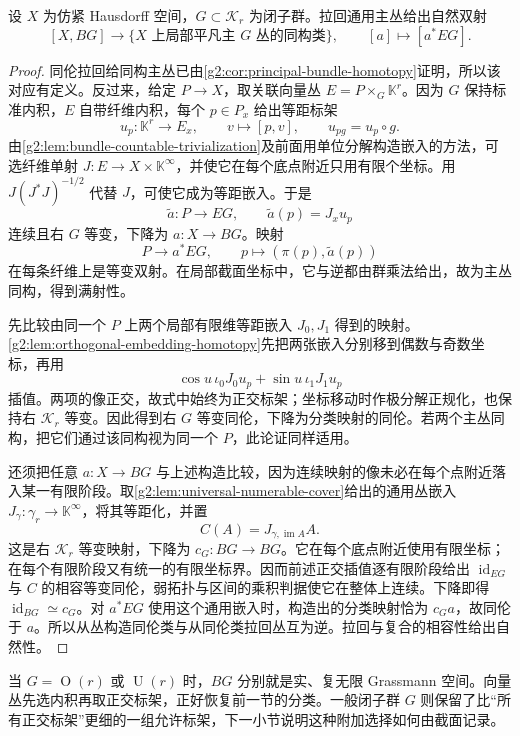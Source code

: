 \begin{theorem}\label{g2:thm:compact-matrix-principal-classification}
	设 \(X\) 为仿紧 Hausdorff 空间，\(G\subset \mathcal K_r\) 为闭子群。拉回通用主丛给出自然双射
	\[
		[X,BG]\longrightarrow
		\{X\text{ 上局部平凡主 }G\text{ 丛的同构类}\},
		\qquad [a]\longmapsto[a^*EG].
	\]
\end{theorem}
\begin{proof}
	同伦拉回给同构主丛已由\cref{g2:cor:principal-bundle-homotopy}证明，所以该对应有定义。反过来，给定 \(P\to X\)，取关联向量丛 \(E=P\times_G \mathbb K^r\)。因为 \(G\) 保持标准内积，\(E\) 自带纤维内积，每个 \(p\in P_x\) 给出等距标架
	\[
		u_p:\mathbb K^r\longrightarrow E_x,\qquad v\longmapsto[p,v],
		\qquad u_{pg}=u_p\circ g.
	\]
	由\cref{g2:lem:bundle-countable-trivialization}及前面用单位分解构造嵌入的方法，可选纤维单射 \(J:E\to X\times \mathbb K^\infty\)，并使它在每个底点附近只用有限个坐标。用 \(J(J^*J)^{-1/2}\) 代替 \(J\)，可使它成为等距嵌入。于是
	\[
		\widetilde a:P\longrightarrow EG,\qquad
		\widetilde a(p)=J_xu_p
	\]
	连续且右 \(G\) 等变，下降为 \(a:X\to BG\)。映射
	\[
		P\longrightarrow a^*EG,\qquad p\longmapsto(\pi(p),\widetilde a(p))
	\]
	在每条纤维上是等变双射。在局部截面坐标中，它与逆都由群乘法给出，故为主丛同构，得到满射性。

	先比较由同一个 \(P\) 上两个局部有限维等距嵌入 \(J_0,J_1\) 得到的映射。\cref{g2:lem:orthogonal-embedding-homotopy}先把两张嵌入分别移到偶数与奇数坐标，再用
	\[
		\cos u\,\iota_0J_0u_p+\sin u\,\iota_1J_1u_p
	\]
	插值。两项的像正交，故式中始终为正交标架；坐标移动时作极分解正规化，也保持右 \(\mathcal K_r\) 等变。因此得到右 \(G\) 等变同伦，下降为分类映射的同伦。若两个主丛同构，把它们通过该同构视为同一个 \(P\)，此论证同样适用。

	还须把任意 \(a:X\to BG\) 与上述构造比较，因为连续映射的像未必在每个点附近落入某一有限阶段。取\cref{g2:lem:universal-numerable-cover}给出的通用丛嵌入 \(J_\gamma:\gamma_r\to \mathbb K^\infty\)，将其等距化，并置
	\[
		C(A)=J_{\gamma,\operatorname{im}A}A.
	\]
	这是右 \(\mathcal K_r\) 等变映射，下降为 \(c_G:BG\to BG\)。它在每个底点附近使用有限坐标；在每个有限阶段又有统一的有限坐标界。因而前述正交插值逐有限阶段给出 \(\operatorname{id}_{EG}\) 与 \(C\) 的相容等变同伦，弱拓扑与区间的乘积判据使它在整体上连续。下降即得 \(\operatorname{id}_{BG}\simeq c_G\)。对 \(a^*EG\) 使用这个通用嵌入时，构造出的分类映射恰为 \(c_Ga\)，故同伦于 \(a\)。所以从丛构造同伦类与从同伦类拉回丛互为逆。拉回与复合的相容性给出自然性。
\end{proof}

当 \(G=\operatorname O(r)\) 或 \(\operatorname U(r)\) 时，\(BG\) 分别就是实、复无限 Grassmann 空间。向量丛先选内积再取正交标架，正好恢复前一节的分类。一般闭子群 \(G\) 则保留了比“所有正交标架”更细的一组允许标架，下一小节说明这种附加选择如何由截面记录。

